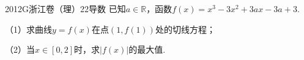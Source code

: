
\begin{problem}{2012}{G}{浙江卷（理）}{22}{导数}
已知$a\in\mathbb{R}$，函数$f(x)=x^3-3x^2+3ax-3a+3$.

（1）求曲线$y=f(x)$在点$(1,f(1))$处的切线方程；

（2）当$x\in[0,2]$时，求$|f(x)|$的最大值.
\end{problem}
